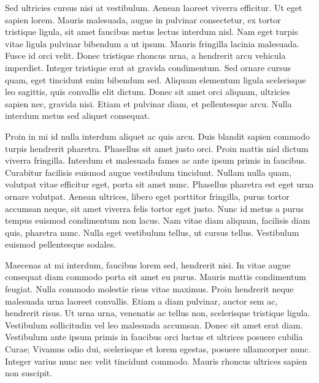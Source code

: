Sed ultricies cursus nisi at vestibulum. Aenean laoreet viverra
efficitur. Ut eget sapien lorem. Mauris malesuada, augue in pulvinar
consectetur, ex tortor tristique ligula, sit amet faucibus metus
lectus interdum nisl. Nam eget turpis vitae ligula pulvinar bibendum a
ut ipsum. Mauris fringilla lacinia malesuada. Fusce id orci
velit. Donec tristique rhoncus urna, a hendrerit arcu vehicula
imperdiet. Integer tristique erat at gravida condimentum. Sed ornare
cursus quam, eget tincidunt enim bibendum sed. Aliquam elementum
ligula scelerisque leo sagittis, quis convallis elit dictum. Donec sit
amet orci aliquam, ultricies sapien nec, gravida nisi. Etiam et
pulvinar diam, et pellentesque arcu. Nulla interdum metus sed aliquet
consequat.

Proin in mi id nulla interdum aliquet ac quis arcu. Duis blandit
sapien commodo turpis hendrerit pharetra. Phasellus sit amet justo
orci. Proin mattis nisl dictum viverra fringilla. Interdum et
malesuada fames ac ante ipsum primis in faucibus. Curabitur facilisis
euismod augue vestibulum tincidunt. Nullam nulla quam, volutpat vitae
efficitur eget, porta sit amet nunc. Phasellus pharetra est eget urna
ornare volutpat. Aenean ultrices, libero eget porttitor fringilla,
purus tortor accumsan neque, sit amet viverra felis tortor eget
justo. Nunc id metus a purus tempus euismod condimentum non lacus. Nam
vitae diam aliquam, facilisis diam quis, pharetra nunc. Nulla eget
vestibulum tellus, ut cursus tellus. Vestibulum euismod pellentesque
sodales.

Maecenas at mi interdum, faucibus lorem sed, hendrerit nisi. In vitae
augue consequat diam commodo porta sit amet eu purus. Mauris mattis
condimentum feugiat. Nulla commodo molestie risus vitae maximus. Proin
hendrerit neque malesuada urna laoreet convallis. Etiam a diam
pulvinar, auctor sem ac, hendrerit risus. Ut urna urna, venenatis ac
tellus non, scelerisque tristique ligula. Vestibulum sollicitudin vel
leo malesuada accumsan. Donec sit amet erat diam. Vestibulum ante
ipsum primis in faucibus orci luctus et ultrices posuere cubilia
Curae; Vivamus odio dui, scelerisque et lorem egestas, posuere
ullamcorper nunc. Integer varius nunc nec velit tincidunt
commodo. Mauris rhoncus ultrices sapien non suscipit.


\endinput